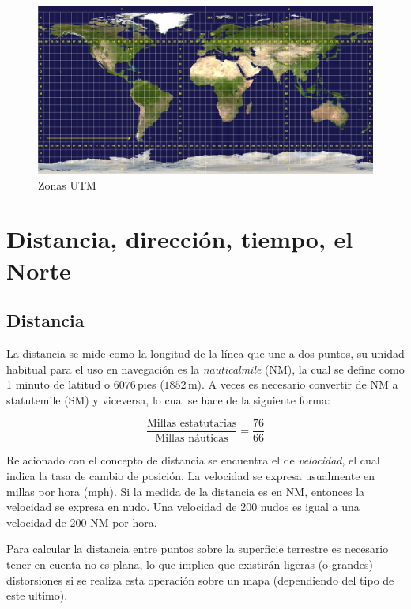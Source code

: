 \begin{figure}[!htb]
  \centering
  \includegraphics[width=\textwidth]{./Imagenes/06.00.navegacion/Utm-zones.jpg}
  \caption{Zonas UTM}
  \label{fig:zonas.utm}
\end{figure}


\section{Distancia, direcci\'on, tiempo, el Norte}
\label{sec:distancia.direccion.tiempo}

\subsection{Distancia}
\label{sec:distancia}

La distancia se mide como la longitud de la l\'inea que une a dos puntos, su unidad habitual para el uso en navegaci\'on es la \emph{\gls{nauticalmile}} (NM), la cual se define como 1 minuto de latitud o $6076$\,pies ($1852$\,m). A veces es necesario convertir de NM a \gls{statutemile} (SM) y viceversa, lo cual se hace de la siguiente forma:

\[\displaystyle
	\frac{\text{Millas estatutarias}}{\text{Millas n\'auticas}} 
	= \frac{76}{66}
\]

Relacionado con el concepto de distancia se encuentra el de \emph{velocidad}, el cual indica la tasa de cambio de posici\'on. La velocidad se expresa usualmente en millas por hora (mph). Si la medida de la distancia es en NM, entonces la velocidad se expresa en \gls{nudo}. Una velocidad de 200 nudos es igual a una velocidad de 200 NM por hora.

Para calcular la distancia entre puntos sobre la superficie terrestre es necesario tener en cuenta no es plana, lo que implica que existir\'an ligeras (o grandes) distorsiones si se realiza esta operaci\'on sobre un mapa (dependiendo
del tipo de este ultimo).
  
